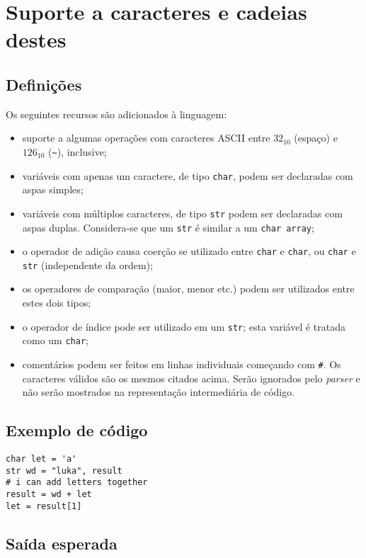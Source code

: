 \documentclass{sftex/sftex}
\newenvironment{smallitem}{
    \vspace{-1mm}
    \begin{itemize}
    \setlength{\parskip}{0pt}
    \setlength{\itemsep}{2pt}
}{
    \vspace{-2mm}
    \end{itemize}
}
\begin{document}
\section{Suporte a caracteres e cadeias destes}

\subsection{Definições}

Os seguintes recursos são adicionados à linguagem:

\begin{smallitem}
    \item suporte a algumas operações com caracteres ASCII entre $32_{10}$
        (espaço) e $126_{10}$ (\verb!~!), inclusive;
    \item variáveis com apenas um caractere, de tipo \verb!char!, podem ser
        declaradas com aspas simples;
    \item variáveis com múltiplos caracteres, de tipo \verb!str! podem ser
        declaradas com aspas duplas. Considera-se que um \verb!str! é
        similar a um \verb!char array!;
    \item o operador de adição causa coerção se utilizado entre \verb!char! e
        \verb!char!, ou \verb!char! e \verb!str! (independente da ordem);
    \item os operadores de comparação (maior, menor etc.) podem ser utilizados
        entre estes dois tipos;
    \item o operador de índice pode ser utilizado em um \verb!str!; esta
        variável é tratada como um \verb!char!;
    \item comentários podem ser feitos em linhas individuais começando com
        \verb!#!. Os caracteres válidos são os mesmos citados acima.
        Serão ignorados pelo \emph{parser} e não serão mostrados na
        representação intermediária de código.
\end{smallitem}

\subsection{Exemplo de código}

\begin{verbatim}
char let = 'a'
str wd = "luka", result
# i can add letters together
result = wd + let
let = result[1]
\end{verbatim}

\subsection{Saída esperada}
\end{document}

